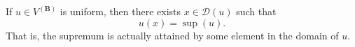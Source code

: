 If $u \in V^{(\mathbf{B})}$ is uniform, then there exists $x \in \mathcal{D}(u)$ such that
$$u(x) = \sup(u).$$
That is, the supremum is actually attained by some element in the domain of $u$.
